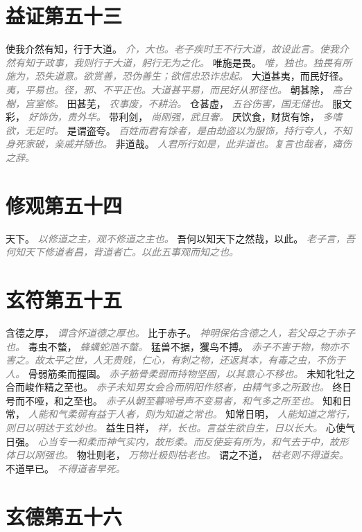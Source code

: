 \documentclass[a4paper,zihao=-4,oneside,landscape,UTF8]{ctexart}
\newcommand{\zhushi}[1]{\scriptsize{\textit{\textcolor{gray}{#1}}}\normalsize}
\begin{document}
\section{益证第五十三}

使我介然有知，行于大道。
\zhushi{介，大也。老子疾时王不行大道，故设此言。使我介然有知于政事，我则行于大道，躬行无为之化。}
唯施是畏。
\zhushi{唯，独也。独畏有所施为，恐失道意。欲赏善，恐伪善生；欲信忠恐诈忠起。}
大道甚夷，而民好径。
\zhushi{夷，平易也。径，邪、不平正也。大道甚平易，而民好从邪径也。}
朝甚除，
\zhushi{高台榭，宫室修。}
田甚芜，
\zhushi{农事废，不耕治。}
仓甚虚，
\zhushi{五谷伤害，国无储也。}
服文彩，
\zhushi{好饰伪，贵外华。}
带利剑，
\zhushi{尚刚强，武且奢。}
厌饮食，财货有馀，
\zhushi{多嗜欲，无足时。}
是谓盗夸。
\zhushi{百姓而君有馀者，是由劫盗以为服饰，持行夸人，不知身死家破，亲戚并随也。}
非道哉。
\zhushi{人君所行如是，此非道也。复言也哉者，痛伤之辞。}


\section{修观第五十四}

天下。
\zhushi{以修道之主，观不修道之主也。}
吾何以知天下之然哉，以此。
\zhushi{老子言，吾何知天下修道者昌，背道者亡。以此五事观而知之也。}


\section{玄符第五十五}

含德之厚，
\zhushi{谓含怀道德之厚也。}
比于赤子。
\zhushi{神明保佑含德之人，若父母之于赤子也。}
毒虫不螫，
\zhushi{蜂蠇蛇虺不螫。}
猛兽不据，玃鸟不搏。
\zhushi{赤子不害于物，物亦不害之。故太平之世，人无贵贱，仁心，有刺之物，还返其本，有毒之虫，不伤于人。}
骨弱筋柔而握固。
\zhushi{赤子筋骨柔弱而持物坚固，以其意心不移也。}
未知牝牡之合而峻作精之至也。
\zhushi{赤子未知男女会合而阴阳作怒者，由精气多之所致也。}
终日号而不哑，和之至也。
\zhushi{赤子从朝至暮啼号声不变易者，和气多之所至也。}
知和日常，
\zhushi{人能和气柔弱有益于人者，则为知道之常也。}
知常日明，
\zhushi{人能知道之常行，则日以明达于玄妙也。}
益生日祥，
\zhushi{祥，长也。言益生欲自生，日以长大。}
心使气日强。
\zhushi{心当专一和柔而神气实内，故形柔。而反使妄有所为，和气去于中，故形体日以刚强也。}
物壮则老，
\zhushi{万物壮极则枯老也。}
谓之不道，
\zhushi{枯老则不得道矣。}
不道早已。
\zhushi{不得道者早死。}


\section{玄德第五十六}
\end{document}
